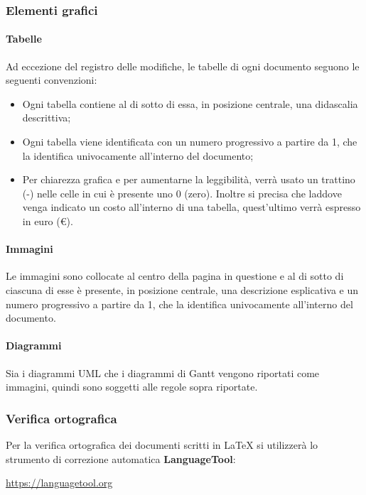 \subsubsection{Elementi grafici}
\paragraph{Tabelle}
Ad eccezione del registro delle modifiche, le tabelle di ogni documento seguono le seguenti convenzioni:
\begin{itemize}
    \item Ogni tabella contiene al di sotto di essa, in posizione centrale, una didascalia descrittiva;
    \item Ogni tabella viene identificata con un numero progressivo a partire da 1, che la identifica univocamente all'interno del documento;
    \item Per chiarezza grafica e per aumentarne la leggibilità, verrà usato un trattino (-) nelle celle in cui è presente uno 0 (zero). Inoltre si precisa che laddove venga indicato un costo all'interno di una tabella, quest'ultimo verrà espresso in euro (€).
\end{itemize}
\paragraph{Immagini}
Le immagini sono collocate al centro della pagina in questione e al di sotto di ciascuna di esse è presente, in posizione centrale, una descrizione esplicativa e un numero progressivo a partire da 1, che la identifica univocamente all'interno del documento.
\paragraph{Diagrammi}
Sia i diagrammi UML\glo{} che i diagrammi di Gantt\glo{} vengono riportati come immagini, quindi sono soggetti alle regole sopra riportate.
\subsubsection{Verifica ortografica} \label{verifica_ortografica}
Per la verifica ortografica dei documenti scritti in \LaTeX{} si utilizzerà lo strumento di correzione automatica \textbf{LanguageTool}:
\begin{center}\url{https://languagetool.org}\end{center}

